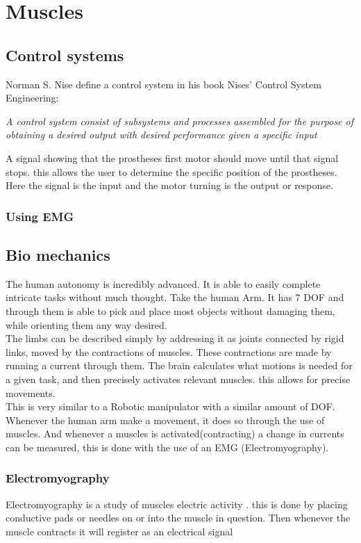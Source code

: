 \chapter{Muscles}\label{ch:Beef}
\section{Control systems}
Norman S. Nise define a control system in his book Nises' Control System Engineering:
\begin{displayquote}
\textit{A control system consist of subsystems and processes assembled for the purpose of obtaining a desired output with desired performance given a specific input}
\end{displayquote}

\noindent A signal showing that the prostheses first motor should move until that signal stops. this allows the user to determine the specific position of the prostheses. Here the signal is the input and the motor turning is the output or response. 
\subsection{Using EMG}

\section{Bio mechanics}
The human autonomy is incredibly advanced. It is able to easily complete intricate tasks without much thought. 
Take the human Arm. It has 7 DOF and through them is able to pick and place most objects without damaging them, while orienting them any way desired. \cite{Redundan25:online}\\ 
The limbs can be described simply by addressing it as joints connected by rigid links, moved by the contractions of muscles. These contractions are made by running a current through them. The brain calculates what motions is needed for a given task, and then precisely activates relevant muscles. this allows for precise movements. \\
This is very similar to a Robotic manipulator with a similar amount of DOF.
Whenever the human arm make a movement, it does so through the use of muscles. And whenever a muscles is activated(contracting)  a change in currents can be measured, this is done with the use of an EMG (Electromyography). \cite{Electrom76:online}

\subsection{Electromyography}
Electromyography is a study of muscles electric activity \cite{Nerveled75:online}.
this is done by placing conductive pads or needles on or into the muscle in question. Then whenever the muscle contracts it will register as an electrical signal
